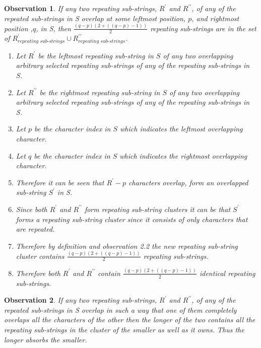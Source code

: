 \documentclass[12pt]{article}
\newtheorem{obser}{Observation}[section]
\begin{document}
\begin{flushleft}
	\begin{obser}
	If any two repeating sub-strings, $R^{\prime}$ and $R^{\prime\prime}$, of any of the repeated sub-strings in S overlap at some leftmost position, $p$, and rightmost position ,$q$, in S, then $\frac{(q - p)(2 + ((q - p)-1))}{2}$ repeating sub-strings are in the set of $R^{\prime}_{\textit{repeating sub-strings}} \cup R^{\prime\prime}_{\textit{repeating sub-strings}}$.
		\begin{enumerate}
			\item Let $R^{\prime}$ be the leftmost repeating sub-string in $S$ of any two overlapping arbitrary selected repeating sub-strings of any of the repeating sub-strings in S.  
			\item Let $R^{\prime\prime}$ be the rightmost repeating sub-string in $S$ of any two overlapping arbitrary selected repeating sub-strings of any of the repeating sub-strings in S.
			\item Let $p$ be the character index in $S$ which indicates the leftmost overlapping character.
			\item Let $q$ be the character index in $S$ which indicates the rightmost overlapping character.
			\item Therefore it can be seen that $R^{\prime} - p$ characters overlap, form an overlapped sub-string $S^{\prime}$ in S.
			\item Since both $R^{\prime}$ and $R^{\prime\prime}$ form repeating sub-string clusters it can be that $S^{\prime}$ forms a repeating sub-string cluster since it consists of only characters that are repeated.
			\item Therefore by definition and observation 2.2 the new repeating sub-string cluster contains $\frac{(q - p)(2 + ((q - p)-1))}{2}$ repeating sub-strings.
			\item Therefore both $R^{\prime}$ and $R^{\prime\prime}$ contain $\frac{(q - p)(2 + ((q - p)-1))}{2}$ identical repeating sub-strings.
		\end{enumerate}
	\end{obser}
	
	\begin{obser}
	If any two repeating sub-strings, $R^{\prime}$ and $R^{\prime\prime}$, of any of the repeated sub-strings in S overlap in such a way that one of them completely overlaps all the characters of the other then the longer of the two contains all the repeating sub-strings in the cluster of the smaller as well as it owns. Thus the longer absorbs the smaller. 
	\end{obser}
	

\end{flushleft}
\end{document}
